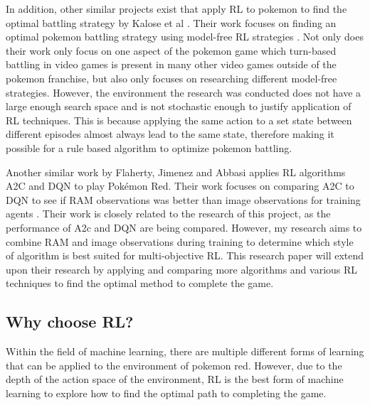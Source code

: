 In addition, other similar projects exist that apply RL to pokemon to find the optimal battling strategy by Kalose et al \cite{kalose2018optimal}. Their work focuses on finding an optimal pokemon battling strategy using model-free RL strategies \cite{kalose2018optimal}. Not only does their work only focus on one aspect of the pokemon game which turn-based battling in video games is present in many other video games outside of the pokemon franchise, but also only focuses on researching different model-free strategies. However, the environment the research was conducted does not have a large enough search space and is not stochastic enough to justify application of RL techniques. This is because applying the same action to a set state between different episodes almost always lead to the same state, therefore making it possible for a rule based algorithm to optimize pokemon battling. 

Another similar work by Flaherty, Jimenez and Abbasi \cite{flaherty2021playing} applies RL algorithms A2C and DQN to play Pokémon Red. Their work focuses on comparing A2C to DQN to see if RAM observations was better than image observations for training agents \cite{flaherty2021playing}. Their work is  closely related to the research of this project, as the performance of A2c and DQN are being compared. However, my research aims to combine RAM and image observations during training to determine which style of algorithm is best suited for multi-objective RL. This research paper will extend upon their research by applying and comparing more algorithms and various RL techniques to find the optimal method to complete the game.

\subsection{Why choose RL?}

Within the field of machine learning, there are multiple different forms of learning that can be applied to the environment of pokemon red. However, due to the depth of the action space of the environment, RL is the best form of machine learning to explore how to find the optimal path to completing the game. 

